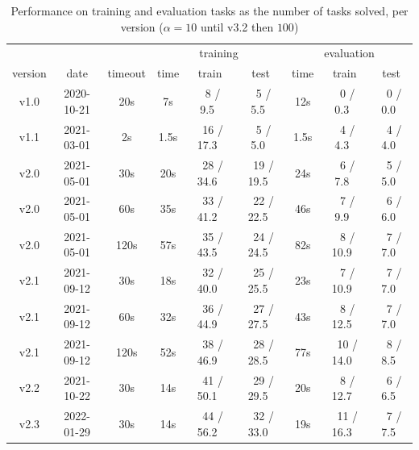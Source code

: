 \documentclass[a4paper]{llncs}
\begin{document}
\begin{table}[t]
  \centering
  \caption{Performance on training and evaluation tasks as the number of tasks solved, per version ($\alpha = 10$ until v3.2 then $100$)}
  \begin{tabular}{|c|c|c|c|c|c|c|c|c|}
    \hline
     & & & \multicolumn{3}{c|}{training} & \multicolumn{3}{c|}{evaluation} \\
    version & date & timeout & time & train & test & time & train & test \\
    \hline
    \hline
    v1.0 & 2020-10-21 & 20s & 7s & ~8 / 9.5~ & ~5 / 5.5~ & 12s & ~0 / 0.3~ & ~0 / 0.0~ \\
    \hline
    v1.1 & 2021-03-01 & 2s & 1.5s & ~16 / 17.3~ & ~5 / 5.0~ & 1.5s & ~4 / 4.3~ & ~4 / 4.0~ \\
    \hline
    \hline
    v2.0 & 2021-05-01 & 30s & 20s & ~28 / 34.6~ & ~19 / 19.5~ & 24s & ~6 / 7.8~  & ~5 / 5.0~ \\
    v2.0 & 2021-05-01 & 60s & 35s & ~33 / 41.2~ & ~22 / 22.5~ & 46s & ~7 / 9.9~ & ~6 / 6.0~ \\
    v2.0 & 2021-05-01 & 120s & 57s & ~35 / 43.5~ & ~24 / 24.5~ & 82s & ~8 / 10.9~ & ~7 / 7.0~ \\
    \hline
    v2.1 & 2021-09-12 & 30s & 18s & ~32 / 40.0~ & ~25 / 25.5~ & 23s & ~7 / 10.9~ & ~7 / 7.0~ \\
    v2.1 & 2021-09-12 & 60s & 32s & ~36 / 44.9~ & ~27 / 27.5~ & 43s & ~8 / 12.5~ & ~7 / 7.0~ \\
    v2.1 & 2021-09-12 & 120s & 52s & ~38 / 46.9~ & ~28 / 28.5~ & 77s & ~10 / 14.0~ & ~8 / 8.5~ \\
    \hline
    v2.2 & 2021-10-22 & 30s & 14s & ~41 / 50.1~ & ~29 / 29.5~ & 20s & ~8 / 12.7~ & ~6 / 6.5~ \\
    \hline
    v2.3 & 2022-01-29 & 30s & 14s & ~44 / 56.2~ & ~32 / 33.0~ & 19s & ~11 / 16.3~ & ~7 / 7.5~ \\

\end{tabular}
\end{table}
\end{document}
